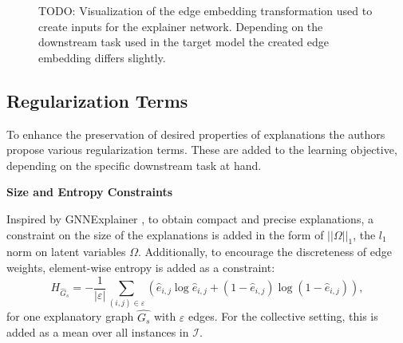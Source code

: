 \begin{figure}
\caption[Visualization of edge embedding transformation]{TODO: Visualization of the edge embedding transformation used to create inputs for the explainer network. Depending on the downstream task used in the target model the created edge embedding differs slightly.}
\end{figure}

\subsection{Regularization Terms}
\label{sec:Regularization_Terms}
To enhance the preservation of desired properties of explanations the authors propose various regularization terms. These are added to the learning objective, depending on the specific downstream task at hand.\bigskip

\textbf{Size and Entropy Constraints}\par
Inspired by GNNExplainer \cite{ying2019gnnexplainer}, to obtain compact and precise explanations, a constraint on the size of the explanations is added in the form of $||\Omega||_1$, the $l_1$ norm on latent variables $\Omega$. Additionally, to encourage the discreteness of edge weights, element-wise entropy is added as a constraint:
\begin{equation}
    H_{\hat{G}_s} = -\frac{1}{|\varepsilon|}\sum_{(i,j)\in \varepsilon} (\hat{e}_{i,j}\log \hat{e}_{i,j} + (1-\hat{e}_{i,j})\log(1-\hat{e}_{i,j})),
\end{equation}
for one explanatory graph $\hat{G_s}$ with $\varepsilon$ edges. For the collective setting, this is added as a mean over all instances in $\mathcal{I}$. \bigskip

